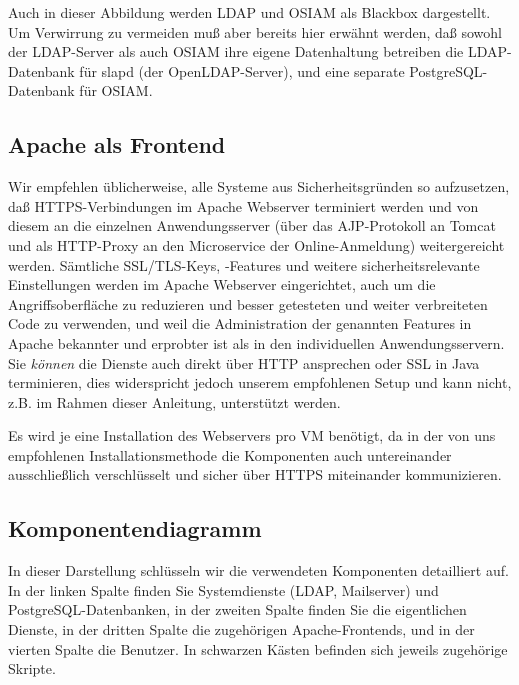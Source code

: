\documentclass{tarentanleitung}
\begin{document}
Auch in dieser Abbildung werden LDAP und OSIAM als Blackbox
dargestellt. Um Verwirrung zu vermeiden muß aber bereits hier
erwähnt werden, daß sowohl der LDAP-Server als auch OSIAM ihre
eigene Datenhaltung betreiben \dash die LDAP-Datenbank für slapd
(der OpenLDAP-Server), und eine separate PostgreSQL-Datenbank
für OSIAM.

\subsection{Apache als Frontend}\label{subsec:intro-apache}

Wir empfehlen üblicherweise, alle Systeme aus Sicherheitsgründen so
aufzusetzen, daß HTTPS-Verbindungen im Apache Webserver terminiert
werden und von diesem an die einzelnen Anwendungsserver (über das
AJP-Protokoll an Tomcat und als HTTP-Proxy an den Microservice der
Online-Anmeldung) weitergereicht werden. Sämtliche SSL/TLS-Keys, ‑Features
und weitere sicherheitsrelevante Einstellungen werden im Apache Webserver
eingerichtet, auch um die Angriffsoberfläche zu reduzieren und besser
getesteten und weiter verbreiteten Code zu verwenden, und weil die
Administration der genannten Features in Apache bekannter und erprobter
ist als in den individuellen Anwendungsservern. Sie \emph{können} die
Dienste auch direkt über HTTP ansprechen oder SSL in Java terminieren,
dies widerspricht jedoch unserem empfohlenen Setup und kann nicht, z.B.
im Rahmen dieser Anleitung, unterstützt werden.

Es wird je eine Installation des Webservers pro VM benötigt, da in
der von uns empfohlenen Installationsmethode die Komponenten auch
untereinander ausschließlich verschlüsselt und sicher über HTTPS
miteinander kommunizieren.

\subsection{Komponentendiagramm}\label{subsec:intro-overview-fine}

In dieser Darstellung schlüsseln wir die verwendeten Komponenten
detailliert auf. In der linken Spalte finden Sie Systemdienste
(LDAP, Mailserver) und PostgreSQL-Datenbanken, in der zweiten
Spalte finden Sie die eigentlichen Dienste, in der dritten Spalte
die zugehörigen Apache-Frontends, und in der vierten Spalte die
Benutzer. In schwarzen Kästen befinden sich jeweils zugehörige
Skripte.
\end{document}
